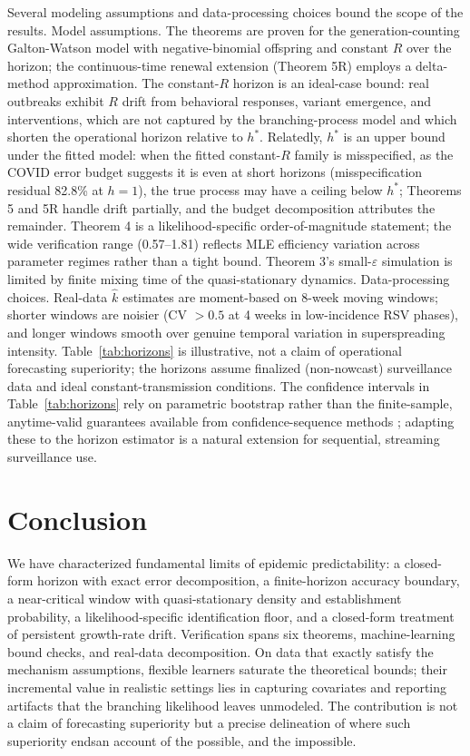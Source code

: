 \documentclass[review]{elsarticle}
\theoremstyle{plain}
\theoremstyle{definition}
\begin{document}
Several modeling assumptions and data-processing choices bound the scope of the results. Model assumptions. The theorems are proven for the generation-counting Galton-Watson model with negative-binomial offspring and constant $R$ over the horizon; the continuous-time renewal extension (Theorem 5R) employs a delta-method approximation. The constant-$R$ horizon is an ideal-case bound: real outbreaks exhibit $R$ drift from behavioral responses, variant emergence, and interventions, which are not captured by the branching-process model and which shorten the operational horizon relative to $h^*$. Relatedly, $h^*$ is an upper bound under the fitted model: when the fitted constant-$R$ family is misspecified, as the COVID error budget suggests it is even at short horizons (misspecification residual 82.8\% at $h=1$), the true process may have a ceiling below $h^*$; Theorems 5 and 5R handle drift partially, and the budget decomposition attributes the remainder. Theorem 4 is a likelihood-specific order-of-magnitude statement; the wide verification range (0.57--1.81) reflects MLE efficiency variation across parameter regimes rather than a tight bound. Theorem 3's small-$\varepsilon$ simulation is limited by finite mixing time of the quasi-stationary dynamics. Data-processing choices. Real-data $\hat{k}$ estimates are moment-based on 8-week moving windows; shorter windows are noisier (CV $>0.5$ at 4 weeks in low-incidence RSV phases), and longer windows smooth over genuine temporal variation in superspreading intensity. Table~\ref{tab:horizons} is illustrative, not a claim of operational forecasting superiority; the horizons assume finalized (non-nowcast) surveillance data and ideal constant-transmission conditions. The confidence intervals in Table~\ref{tab:horizons} rely on parametric bootstrap rather than the finite-sample, anytime-valid guarantees available from confidence-sequence methods \citep{howard2021time, shin2022edetectors, waudby2023estimating}; adapting these to the horizon estimator is a natural extension for sequential, streaming surveillance use.



\section{Conclusion}

We have characterized fundamental limits of epidemic predictability: a closed-form horizon with exact error decomposition, a finite-horizon accuracy boundary, a near-critical window with quasi-stationary density and establishment probability, a likelihood-specific identification floor, and a closed-form treatment of persistent growth-rate drift. Verification spans six theorems, machine-learning bound checks, and real-data decomposition. On data that exactly satisfy the mechanism assumptions, flexible learners saturate the theoretical bounds; their incremental value in realistic settings lies in capturing covariates and reporting artifacts that the branching likelihood leaves unmodeled. The contribution is not a claim of forecasting superiority but a precise delineation of where such superiority ends\textemdash an account of the possible, and the impossible.
\end{document}
